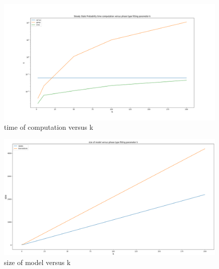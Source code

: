 \documentclass[paper=a4, fontsize=11pt]{scrartcl}
\numberwithin{equation}{section}		%
\numberwithin{figure}{section}			%
\numberwithin{table}{section}				%
\begin{document}
	\begin{figure}
		\centering
		\includegraphics[width=16cm]{time.png}
		\caption{time of computation versus k}
		\label{fig:time1}
	\end{figure}	
	
	\begin{figure}
		\centering
		\includegraphics[width=16cm]{size.png}
		\caption{size of model versus k}
		\label{fig:time1}
	\end{figure}
	


\end{document}
